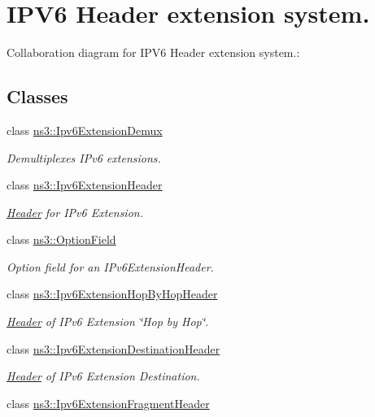 \hypertarget{group__ipv6HeaderExt}{}\section{I\+P\+V6 Header extension system.}
\label{group__ipv6HeaderExt}
Collaboration diagram for I\+P\+V6 Header extension system.\+:
\subsection*{Classes}
\begin{DoxyCompactItemize}
\item 
class \hyperlink{classns3_1_1Ipv6ExtensionDemux}{ns3\+::\+Ipv6\+Extension\+Demux}
\begin{DoxyCompactList}\small\item\em Demultiplexes I\+Pv6 extensions. \end{DoxyCompactList}\item 
class \hyperlink{classns3_1_1Ipv6ExtensionHeader}{ns3\+::\+Ipv6\+Extension\+Header}
\begin{DoxyCompactList}\small\item\em \hyperlink{classns3_1_1Header}{Header} for I\+Pv6 Extension. \end{DoxyCompactList}\item 
class \hyperlink{classns3_1_1OptionField}{ns3\+::\+Option\+Field}
\begin{DoxyCompactList}\small\item\em Option field for an I\+Pv6\+Extension\+Header. \end{DoxyCompactList}\item 
class \hyperlink{classns3_1_1Ipv6ExtensionHopByHopHeader}{ns3\+::\+Ipv6\+Extension\+Hop\+By\+Hop\+Header}
\begin{DoxyCompactList}\small\item\em \hyperlink{classns3_1_1Header}{Header} of I\+Pv6 Extension \char`\"{}\+Hop by Hop\char`\"{}. \end{DoxyCompactList}\item 
class \hyperlink{classns3_1_1Ipv6ExtensionDestinationHeader}{ns3\+::\+Ipv6\+Extension\+Destination\+Header}
\begin{DoxyCompactList}\small\item\em \hyperlink{classns3_1_1Header}{Header} of I\+Pv6 Extension Destination. \end{DoxyCompactList}\item 
class \hyperlink{classns3_1_1Ipv6ExtensionFragmentHeader}{ns3\+::\+Ipv6\+Extension\+Fragment\+Header}

\end{DoxyCompactItemize}
